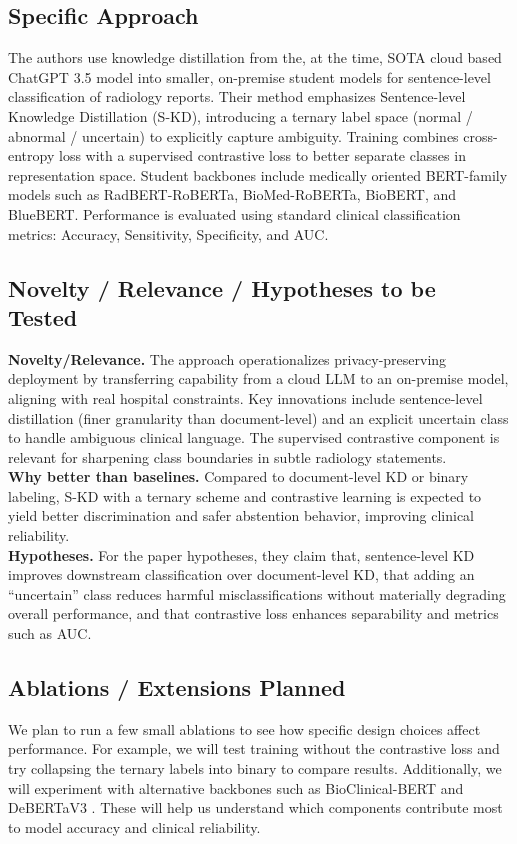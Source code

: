 \documentclass[letterpaper]{article} %
\begin{document}
\subsection{Specific Approach}
The authors use knowledge distillation from the, at the time, SOTA cloud based ChatGPT 3.5 model into smaller, on-premise student models for sentence-level classification of radiology reports. Their method emphasizes Sentence-level Knowledge Distillation (S-KD), introducing a ternary label space (normal / abnormal / uncertain) to explicitly capture ambiguity. Training combines cross-entropy loss with a supervised contrastive loss to better separate classes in representation space. Student backbones include medically oriented BERT-family models such as RadBERT-RoBERTa, BioMed-RoBERTa, BioBERT, and BlueBERT. Performance is evaluated using standard clinical classification metrics: Accuracy, Sensitivity, Specificity, and AUC.

\subsection{Novelty / Relevance / Hypotheses to be Tested}
\textbf{Novelty/Relevance.} The approach operationalizes privacy-preserving deployment by transferring capability from a cloud LLM to an on-premise model, aligning with real hospital constraints. Key innovations include sentence-level distillation (finer granularity than document-level) and an explicit uncertain class to handle ambiguous clinical language. The supervised contrastive component is relevant for sharpening class boundaries in subtle radiology statements. \\
\textbf{Why better than baselines.} Compared to document-level KD or binary labeling, S-KD with a ternary scheme and contrastive learning is expected to yield better discrimination and safer abstention behavior, improving clinical reliability. \\
\textbf{Hypotheses.} For the paper hypotheses, they claim that, sentence-level KD improves downstream classification over document-level KD, that adding an ``uncertain'' class reduces harmful misclassifications without materially degrading overall performance, and that contrastive loss enhances separability and metrics such as AUC.

\subsection{Ablations / Extensions Planned}
We plan to run a few small ablations to see how specific design choices affect performance. For example, we will test training without the contrastive loss and try collapsing the ternary labels into binary to compare results. Additionally, we will experiment with alternative backbones such as BioClinical-BERT \cite{sounack2025bioclinicalmodernbertstateoftheartlongcontext} and DeBERTaV3 \cite{he2021debertav3}. These will help us understand which components contribute most to model accuracy and clinical reliability.
\end{document}
